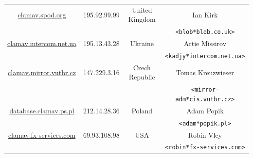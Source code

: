 \documentclass[a4paper,titlepage,12pt]{article}
\newcommand{\email}[1]{\texttt{#1}}
\begin{document}
\begin{center}
{\begin{tabular}{|c|c|c|c|}
	\url{clamav.spod.org} & 195.92.99.99 & United Kingdom & Ian Kirk\\
			      &		     &		      & \email{<blob*blob.co.uk>}\\ \hline
	\url{clamav.intercom.net.ua} & 195.13.43.28 & Ukraine & Artie Missirov\\
				     &		    &	      & \email{<kadjy*intercom.net.ua>}\\ \hline
	\url{clamav.mirror.vutbr.cz} & 147.229.3.16 & Czech Republic & Tomas Kreuzwieser\\
				     &		    &		     & \email{<mirror-adm*cis.vutbr.cz>}\\ \hline
	\url{database.clamav.ps.pl} & 212.14.28.36 & Poland & Adam Popik\\
				    &		   &	    & \email{<adam*popik.pl>}\\ \hline
	\url{clamav.fx-services.com} & 69.93.108.98 & USA & Robin Vley\\
				     &		    &	  & \email{<robin*fx-services.com>}\\ \hline
    \end{tabular}}
    \end{center}
\end{document}
